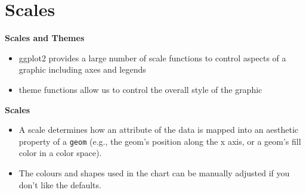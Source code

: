 \documentclass{beamer}
\begin{document}
\section*{Scales}
\begin{frame}
\noindent \textbf{Scales and Themes}
	\begin{itemize}
	\item ggplot2 provides a large number of scale functions
	to control aspects of a graphic including axes and
	legends
	\item theme functions allow us to control the overall style
	of the graphic
	\end{itemize}

\end{frame}

\begin{frame}
	\Large
	\noindent \textbf{Scales}
	\begin{itemize}
		\item A scale determines how an attribute of the data is mapped into an aesthetic property of a \texttt{geom} (e.g., the geom's position along the x axis, or a geom's fill color in a color space).
		\item The colours and shapes used in the chart can be manually adjusted if you don’t like the defaults.
	\end{itemize}
	
\end{frame}
\end{document}
